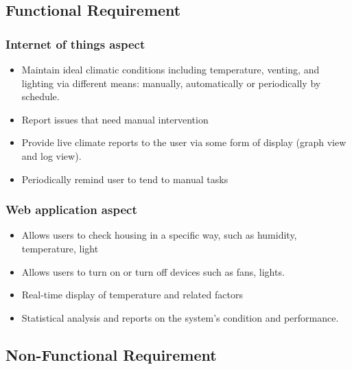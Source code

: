 \documentclass[a4paper, 13pt]{article}
\theoremstyle{definition}
\begin{document}
\subsection{Functional Requirement}
\subsubsection{Internet of things aspect}
\begin{itemize}
    
    \item Maintain ideal climatic conditions including temperature, venting, and lighting via different means: manually, automatically or periodically by schedule.
    \item Report issues that need manual intervention
    \item Provide live climate reports to the user via some form of display (graph view and log view).
    \item Periodically remind user to tend to manual tasks
\end{itemize}
\subsubsection{Web application aspect}
\begin{itemize}
    \item Allows users to check housing in a specific way, such as humidity, temperature, light
    \item Allows users to turn on or turn off devices such as fans, lights.
    \item Real-time display of temperature and related factors
    \item Statistical analysis and reports on the system’s condition and performance.
\end{itemize}
\subsection{Non-Functional Requirement}
\end{document}
